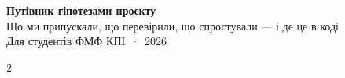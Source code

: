

\thispagestyle{plain}
\begin{center}
{\LARGE\bfseries\sffamily Путівник гіпотезами проєкту}\\[3pt]
{\large\sffamily Що ми припускали, що перевірили, що спростували — і де це в коді}\\[2pt]
{\small Для студентів ФМФ КПІ \,·\, 2026}
\end{center}
\vspace{-1.5em}
{\footnotesize\renewcommand{\cftchapfont}{\bfseries\footnotesize}\renewcommand{\cftchappagefont}{\bfseries\footnotesize}
\renewcommand{\cftsecfont}{\footnotesize}\renewcommand{\cftsecpagefont}{\footnotesize}
\begin{multicols}{2}
\tableofcontents
\end{multicols}}











\appendix



